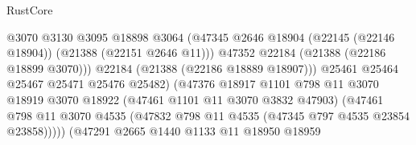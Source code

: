 \begin{lexlean}{RustCore}
\begin{coremodule}
                                                @3070
                                                @3130
                                                @3095
                                                @18898
                                                @3064
                                                (@47345
                                                  @2646
                                                  @18904
                                                  (@22145 (@22146 @18904))
                                                  (@21388 (@22151 @2646 @11)))
                                                @47352
                                                @22184
                                                (@21388 (@22186 @18899 @3070)))
                                              @22184
                                              (@21388 (@22186 @18889 @18907)))
                                            @25461
                                            @25464
                                            @25467
                                            @25471
                                            @25476
                                            @25482)
                                          (@47376
                                            @18917
                                            @1101
                                            @798
                                            @11
                                            @3070
                                            @18919
                                            @3070
                                            @18922
                                            (@47461 @1101 @11 @3070 @3832 @47903)
                                            (@47461
                                              @798
                                              @11
                                              @3070
                                              @4535
                                              (@47832
                                                @798
                                                @11
                                                @4535
                                                (@47345 @797 @4535 @23854 @23858)))))
                                        (@47291
                                          @2665
                                          @1440
                                          @1133
                                          @11
                                          @18950
                                          @18959

\end{coremodule}
\end{lexlean}
